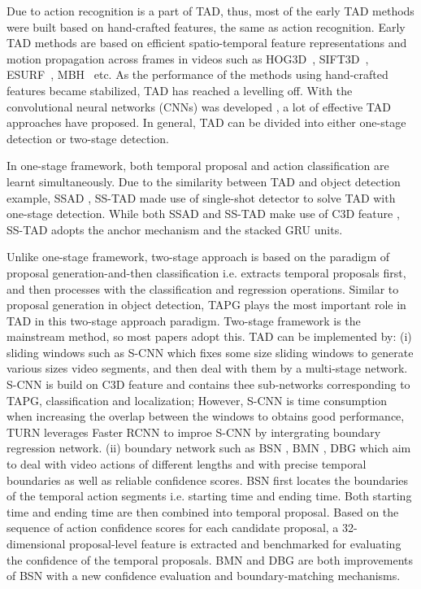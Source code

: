 \documentclass{ieeeaccess}
\begin{document}
Due to action recognition is a part of TAD, thus, most of the early TAD methods were built based on hand-crafted features, the same as action recognition. Early TAD methods are based on efficient spatio-temporal feature representations and motion propagation across frames in videos such as HOG3D~\mbox{\cite{klaser2008spatio}}, SIFT3D~\mbox{\cite{scovanner20073}}, ESURF~\mbox{\cite{willems2008efficient}}, MBH~\mbox{\cite{dalal2006human}} etc. As the performance of the methods using hand-crafted features became stabilized, TAD has reached a levelling off. With the convolutional neural networks (CNNs) was developed \mbox{\cite{krizhevsky2012imagenet}}, a lot of effective TAD approaches have proposed. In general, TAD can be divided into either one-stage detection or two-stage detection.

In one-stage framework, both temporal proposal and action classification are learnt simultaneously. Due to the similarity between TAD and object detection example, SSAD \mbox{\cite{anchor_5}}, SS-TAD \mbox{\cite{SSTAD_BMVC17}} made use of single-shot detector to solve TAD with one-stage detection. While both SSAD and SS-TAD make use of C3D feature \mbox{\cite{C3D_2, C3D_3, c3D_4, c3D_5}}, SS-TAD adopts the anchor mechanism and the stacked GRU units.

Unlike one-stage framework, two-stage approach is based on the paradigm of proposal generation-and-then classification i.e. extracts temporal proposals first, and then processes with the classification and regression operations. Similar to proposal generation in object detection, TAPG plays the most important role in TAD in this two-stage approach paradigm. Two-stage framework is the mainstream method, so most papers adopt this. TAD can be implemented by: (i) sliding windows such as S-CNN \mbox{\cite{anchor_2}} which fixes some size sliding windows to generate various sizes video segments, and then deal with them by a multi-stage network. S-CNN is build on C3D feature and contains thee sub-networks corresponding to TAPG, classification and localization; However, S-CNN is time consumption when increasing the overlap between the windows to obtains good performance, TURN \mbox{\cite{anchor_3}} leverages Faster RCNN to improe S-CNN by intergrating boundary regression network. (ii) boundary network such as BSN \mbox{\cite{lin2018bsn}}, BMN \mbox{\cite{bmn}}, DBG \mbox{\cite{dbg}} which aim to deal with video actions of different lengths and with precise temporal boundaries as well as reliable confidence scores. BSN first locates the boundaries of the temporal action segments i.e. starting time and ending time. Both starting time and ending time are then combined into temporal proposal. Based on the sequence of action confidence scores for each candidate proposal, a 32-dimensional proposal-level feature is extracted and benchmarked for evaluating the confidence of the temporal proposals. BMN and DBG are both improvements of BSN with a new confidence evaluation and boundary-matching mechanisms.
\end{document}
